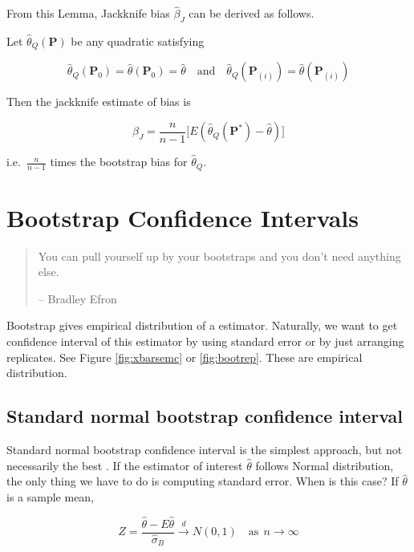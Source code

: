 \documentclass[]{book}
\theoremstyle{definition}
\theoremstyle{definition}
\theoremstyle{definition}
\theoremstyle{remark}
\let\BeginKnitrBlock\begin \let\EndKnitrBlock\end
\begin{document}
From this Lemma, Jackknife bias \(\hat\beta_J\) can be derived as follows.

\BeginKnitrBlock{theorem}[Jackknife bias]
\protect\hypertarget{thm:jackbet}{}{\label{thm:jackbet} {} }Let \(\hat\theta_Q (\mathbf{P})\) be any quadratic satisfying

\[\hat\theta_Q (\mathbf{P}_0) = \hat\theta (\mathbf{P}_0) = \hat\theta \quad \text{and} \quad \hat\theta_Q (\mathbf{P}_{(i)}) = \hat\theta (\mathbf{P}_{(i)})\]

Then the jackknife estimate of bias is

\[\beta_J = \frac{n}{n - 1} \Big[ E(\hat\theta_Q (\mathbf{P}^{\ast}) - \hat\theta) \Big]\]

i.e.~\(\frac{n}{n - 1}\) times the bootstrap bias for \(\hat\theta_Q\).
\EndKnitrBlock{theorem}

\hypertarget{bootstrap-confidence-intervals}{%
\section{Bootstrap Confidence Intervals}\label{bootstrap-confidence-intervals}}

\begin{quote}
You can pull yourself up by your bootstraps and you don't need anything else.

-- Bradley Efron
\end{quote}

Bootstrap gives empirical distribution of a estimator. Naturally, we want to get confidence interval of this estimator by using standard error or by just arranging replicates. See Figure \ref{fig:xbarsemc} or \ref{fig:bootrep}. These are empirical distribution.

\hypertarget{standard-normal-bootstrap-confidence-interval}{%
\subsection{Standard normal bootstrap confidence interval}\label{standard-normal-bootstrap-confidence-interval}}

Standard normal bootstrap confidence interval is the simplest approach, but not necessarily the best \citep{Rizzo:2007aa}. If the estimator of interest \(\hat\theta\) follows Normal distribution, the only thing we have to do is computing standard error. When is this case? If \(\hat\theta\) is a sample mean,

\begin{equation}
  Z = \frac{\hat\theta - E\hat\theta}{\hat\sigma_B} \stackrel{d}{\rightarrow} N(0, 1) \quad \text{as} \:\: n \rightarrow \infty
  \label{eq:bootclt}
\end{equation}
\end{document}
